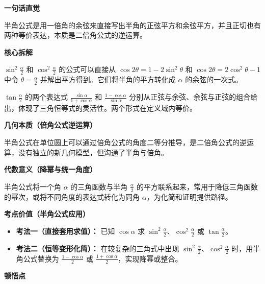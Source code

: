 \begin{explanationbox}

	\textbf{\textcolor{CExplanation}{一句话直觉}}

	半角公式是用一倍角的余弦来直接写出半角的正弦平方和余弦平方，并且正切也有两种等价表达，本质是二倍角公式的逆运算。

	\medskip
	\textbf{\textcolor{CExplanation}{核心拆解}}
	\begin{description}[style=nextline, leftmargin=2.8em, labelsep=0.5em, itemsep=0.45em]
		\item[\textbf{要点一（平方公式来源）：}] $\sin^2\frac{\alpha}{2}$ 和 $\cos^2\frac{\alpha}{2}$ 的公式可以直接从 $\cos2\theta = 1-2\sin^2\theta$ 和 $\cos2\theta = 2\cos^2\theta-1$ 中令 $\theta=\frac{\alpha}{2}$ 并解出平方得到。它们将半角的平方转化成 $\alpha$ 的余弦的一次式。
		\item[\textbf{要点二（正切等价形式）：}] $\tan\frac{\alpha}{2}$ 的两个表达式 $\frac{\sin\alpha}{1+\cos\alpha}$ 和 $\frac{1-\cos\alpha}{\sin\alpha}$ 分别从正弦与余弦、余弦与正弦的组合给出，体现了三角恒等式的灵活性。两个形式在定义域内等价。
	\end{description}

	\medskip
	\textbf{\textcolor{CExplanation}{几何本质（倍角公式逆运算）}}

	半角公式在单位圆上可以通过倍角公式的角度二等分推导，是二倍角公式的逆运算，没有独立的新几何模型，但沟通了半角与倍角。

	\medskip
	\textbf{\textcolor{CExplanation}{代数意义（降幂与统一角度）}}

	半角公式将一个角 $\alpha$ 的三角函数与半角 $\frac{\alpha}{2}$ 的平方联系起来，常用于降低三角函数的幂次，或将不同角度的表达式转化为同角 $\alpha$，为化简和证明提供路径。

	\medskip
	\textbf{\textcolor{CExplanation}{考点价值（半角公式应用）}}
	\begin{itemize}[leftmargin=*, itemsep=0.5em, topsep=0.4em]
		\item \textbf{考法一（直接套用求值）：} 已知 $\cos\alpha$ 求 $\sin^2\frac{\alpha}{2}$、$\cos^2\frac{\alpha}{2}$ 或 $\tan\frac{\alpha}{2}$。
		\item \textbf{考法二（恒等变形化简）：} 在较复杂的三角式中出现 $\sin^2\frac{\alpha}{2}$、$\cos^2\frac{\alpha}{2}$ 时，用半角公式替换为 $\frac{1-\cos\alpha}{2}$ 或 $\frac{1+\cos\alpha}{2}$，实现降幂或整合。
	\end{itemize}

	\medskip
	\textbf{\textcolor{CExplanation}{顿悟点}}


\end{explanationbox}
